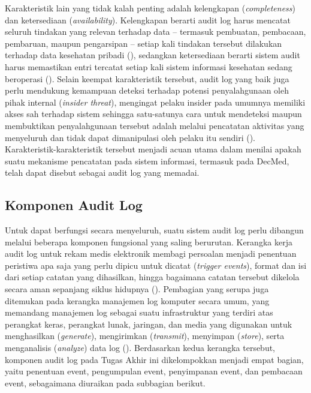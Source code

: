 Karakteristik lain yang tidak kalah penting adalah kelengkapan (\textit{completeness}) dan ketersediaan (\textit{availability}). Kelengkapan berarti audit log harus mencatat seluruh tindakan yang relevan terhadap data -- termasuk pembuatan, pembacaan, pembaruan, maupun pengarsipan -- setiap kali tindakan tersebut dilakukan terhadap data kesehatan pribadi (\cite{iso27789_2021}), sedangkan ketersediaan berarti sistem audit harus memastikan entri tercatat setiap kali sistem informasi kesehatan sedang beroperasi (\cite{iso27789_2021}). Selain keempat karakteristik tersebut, audit log yang baik juga perlu mendukung kemampuan deteksi terhadap potensi penyalahgunaan oleh pihak internal (\textit{insider threat}), mengingat pelaku insider pada umumnya memiliki akses sah terhadap sistem sehingga satu-satunya cara untuk mendeteksi maupun membuktikan penyalahgunaan tersebut adalah melalui pencatatan aktivitas yang menyeluruh dan tidak dapat dimanipulasi oleh pelaku itu sendiri (\cite{cert2022insiderthreat}). Karakteristik-karakteristik tersebut menjadi acuan utama dalam menilai apakah suatu mekanisme pencatatan pada sistem informasi, termasuk pada DecMed, telah dapat disebut sebagai audit log yang memadai.

\subsection{Komponen Audit Log}
\label{subsec:komponen-audit-trail}

Untuk dapat berfungsi secara menyeluruh, suatu sistem audit log perlu dibangun melalui beberapa komponen fungsional yang saling berurutan. Kerangka kerja audit log untuk rekam medis elektronik membagi persoalan menjadi penentuan peristiwa apa saja yang perlu dipicu untuk dicatat (\textit{trigger events}), format dan isi dari setiap catatan yang dihasilkan, hingga bagaimana catatan tersebut dikelola secara aman sepanjang siklus hidupnya (\cite{iso27789_2021}). Pembagian yang serupa juga ditemukan pada kerangka manajemen log komputer secara umum, yang memandang manajemen log sebagai suatu infrastruktur yang terdiri atas perangkat keras, perangkat lunak, jaringan, dan media yang digunakan untuk menghasilkan (\textit{generate}), mengirimkan (\textit{transmit}), menyimpan (\textit{store}), serta menganalisis (\textit{analyze}) data log (\cite{nist80092}). Berdasarkan kedua kerangka tersebut, komponen audit log pada Tugas Akhir ini dikelompokkan menjadi empat bagian, yaitu penentuan event, pengumpulan event, penyimpanan event, dan pembacaan event, sebagaimana diuraikan pada subbagian berikut.

